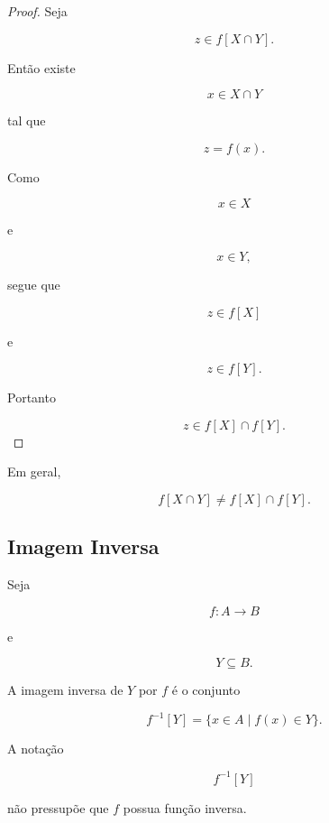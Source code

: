 \documentclass[../../main]{subfiles}
\begin{document}
\begin{proof}

	Seja

	\[
		z\in f[X\cap Y].
	\]

	Então existe

	\[
		x\in X\cap Y
	\]

	tal que

	\[
		z=f(x).
	\]

	Como

	\[
		x\in X
	\]

	e

	\[
		x\in Y,
	\]

	segue que

	\[
		z\in f[X]
	\]

	e

	\[
		z\in f[Y].
	\]

	Portanto

	\[
		z\in f[X]\cap f[Y].
	\]

\end{proof}

\begin{obs}

	Em geral,

	\[
		f[X\cap Y]
		\neq
		f[X]\cap f[Y].
	\]

\end{obs}

\subsection{Imagem Inversa}

\begin{defn}
	\label{def:matematica:funcoes:imagem-direta-e-inversa:imagem-inversa}

	Seja

	\[
		f:A\to B
	\]

	e

	\[
		Y\subseteq B.
	\]

	A imagem inversa de \(Y\) por \(f\) é o conjunto

	\[
		f^{-1}[Y]
		=
		\{
		x\in A
		\mid
		f(x)\in Y
		\}.
	\]

\end{defn}

\begin{obs}

	A notação

	\[
		f^{-1}[Y]
	\]

	não pressupõe que \(f\) possua função inversa.

\end{obs}
\end{document}
